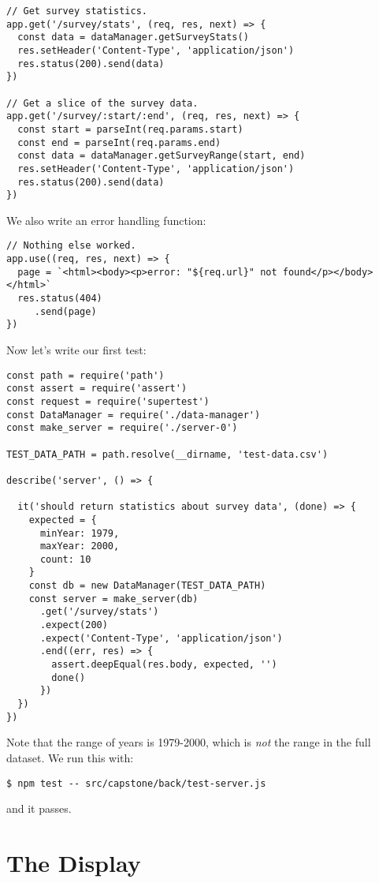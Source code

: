 \begin{verbatim}
// Get survey statistics.
app.get('/survey/stats', (req, res, next) => {
  const data = dataManager.getSurveyStats()
  res.setHeader('Content-Type', 'application/json')
  res.status(200).send(data)
})

// Get a slice of the survey data.
app.get('/survey/:start/:end', (req, res, next) => {
  const start = parseInt(req.params.start)
  const end = parseInt(req.params.end)
  const data = dataManager.getSurveyRange(start, end)
  res.setHeader('Content-Type', 'application/json')
  res.status(200).send(data)
})
\end{verbatim}

\noindent
We also write an error handling function:

\begin{verbatim}
// Nothing else worked.
app.use((req, res, next) => {
  page = `<html><body><p>error: "${req.url}" not found</p></body></html>`
  res.status(404)
     .send(page)
})
\end{verbatim}

Now let's write our first test:

\begin{verbatim}
const path = require('path')
const assert = require('assert')
const request = require('supertest')
const DataManager = require('./data-manager')
const make_server = require('./server-0')

TEST_DATA_PATH = path.resolve(__dirname, 'test-data.csv')

describe('server', () => {

  it('should return statistics about survey data', (done) => {
    expected = {
      minYear: 1979,
      maxYear: 2000,
      count: 10
    }
    const db = new DataManager(TEST_DATA_PATH)
    const server = make_server(db)
      .get('/survey/stats')
      .expect(200)
      .expect('Content-Type', 'application/json')
      .end((err, res) => {
        assert.deepEqual(res.body, expected, '')
        done()
      })
  })
})
\end{verbatim}

Note that the range of years is 1979-2000,
which is \emph{not} the range in the full dataset.
We run this with:

\begin{verbatim}
$ npm test -- src/capstone/back/test-server.js
\end{verbatim}

\noindent
and it passes.

\section{The Display}\label{s:capstone-display}

